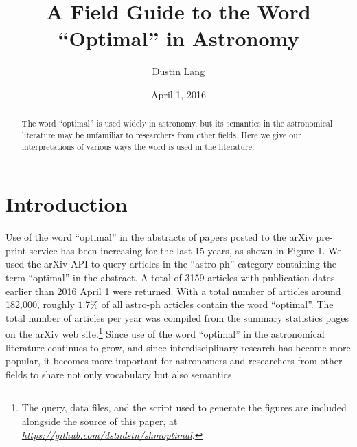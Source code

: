 \documentclass[12pt, preprint]{aastex}
\newcommand{\niceurl}[1]{\href{#1}{\textsl{#1}}}
\begin{document}
\title{A Field Guide to the Word ``Optimal'' in Astronomy}

\author{%
Dustin Lang%
}
\date{\centering April 1, 2016}

\begin{abstract}
The word ``optimal'' is used widely in astronomy, but its semantics
in the astronomical literature
may be unfamiliar to researchers from other fields.  Here we give
our interpretations of various ways the word is used in the literature.
\end{abstract}


\section{Introduction}

Use of the word ``optimal'' in the abstracts of papers posted to the
arXiv pre-print service has been increasing for the last 15 years, as
shown in Figure 1.  We used the arXiv API to query articles in the
``astro-ph'' category containing the term ``optimal'' in the abstract.
A total of 3159 articles with publication dates earlier than 2016
April 1 were returned.  With a total number of articles around
182,000, roughly $1.7\%$ of all astro-ph articles contain the word
``optimal''.  The total number of articles per year was compiled from
the summary statistics pages on the arXiv web site.\footnote{The
  query, data files, and the script used to generate the figures are
  included alongside the source of this paper, at
  \niceurl{https://github.com/dstndstn/shmoptimal}.}  Since use of the
word ``optimal'' in the astronomical literature continues to grow, and
since interdisciplinary research has become more popular, it becomes
more important for astronomers and researchers from other fields to
share not only vocabulary but also semantics.
\end{document}

